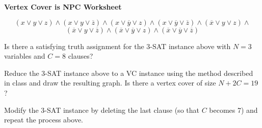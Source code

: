 \documentclass[12pt]{article}
\begin{document}
\newcommand{\I}{\mbox{{\em Int}}}
\newcommand{\lt}{\mbox{{\em left}}}
\newcommand{\rt}{\mbox{{\em right}}}
\newcommand{\ld}{\Delta^l}
\newcommand{\rd}{\Delta^r}
\newcommand{\lsp}[1]{\large\renewcommand{\baselinestretch}{#1}\normalsize}
\newcommand{\hsp}{\hspace{.2in}}

\def\Endwhile{\mbox{\bf endwhile\ }}
\def\Or{\mbox{\bf or\ }}
\def\Do{\mbox{\bf do\ }}
\def\Downto{\mbox{\bf downto\ }}
\def\Int{\mbox{\bf int\ }}
\def\To{\mbox{\bf to\ }}
\def\Repeat{\mbox{\bf repeat\ }}
\def\Until{\mbox{\bf until\ }}
\def\Return{\mbox{\bf return\ }}
\def\Not{\mbox{\bf not\ }}
\def\And{\mbox{\bf and\ }}
\def\For{\mbox{\bf for\ }}
\def\Foreach{\mbox{\bf foreach\ }}
\def\Else{\mbox{\bf else\ }}
\def\Elseif{\mbox{\bf elseif\ }}
\def\End{\mbox{\bf end\ }}
\def\If{\mbox{\bf if\ }}
\def\Mod{\mbox{\bf \ mod\ }}
\def\Then{\mbox{\bf then\ }}
\def\While{\mbox{\bf while\ }}
\def\Output{\mbox{\bf output\ }}


\lsp{1}
\pagestyle{plain}
\begin{center}
{\bf
Vertex Cover is NPC Worksheet 
}
\end{center}

\[
\left(x \vee y \vee z\right) \wedge 
\left(x \vee y \vee \overline{z}\right) \wedge 
\left(x \vee \overline{y} \vee z\right) \wedge 
\left(x \vee \overline{y} \vee \overline{z}\right) \wedge 
\left(\overline{x} \vee y \vee z\right) \wedge\] 
\[
\left(\overline{x} \vee y \vee \overline{z}\right) \wedge 
\left(\overline{x} \vee \overline{y} \vee z\right) \wedge 
\left(\overline{x} \vee \overline{y} \vee \overline{z}\right)
\]

\vspace*{0.05in}

\begin{flushleft}
   Is there a satisfying truth assignment for the 3-SAT instance above with
$N = 3$ variables and $C = 8$ clauses?

   \vspace*{0.5in}

   Reduce the 3-SAT instance above to a VC instance using the method described in class and draw the resulting graph.
Is there a vertex cover of size $N+2C = 19$? 

   \vspace*{4in}

Modify the 3-SAT instance by deleting the last clause (so that $C$ becomes 7)
and repeat the process above. 
\end{flushleft}
\end{document}

